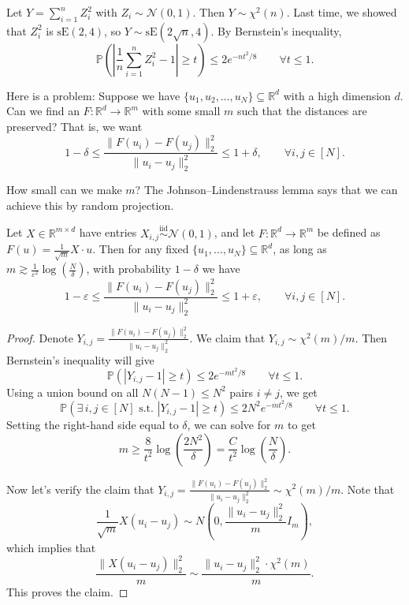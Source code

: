 \begin{exam}
    Let $Y = \sum_{i=1}^n Z_i^2$ with $Z_i \sim \mathcal{N}(0, 1)$. Then $Y \sim \chi^2(n)$. Last time, we showed that $Z_i^2$ is $\mathrm{sE}(2, 4)$, so $Y \sim \mathrm{sE}(2\sqrt{n}, 4)$. By Bernstein's inequality,
\[
\mathbb{P}\!\left( \left| \frac{1}{n} \sum_{i=1}^n Z_i^2 - 1 \right| \geq t \right) \leq 2 e^{-n t^2 / 8} \qquad \forall t \leq 1.
\]

Here is a problem: Suppose we have $\{u_1, u_2, \ldots, u_N\} \subseteq \mathbb{R}^d$ with a high dimension $d$. Can we find an $F : \mathbb{R}^d \to \mathbb{R}^m$ with some small $m$ such that the distances are preserved? That is, we want
\[
1 - \delta \leq \frac{\|F(u_i) - F(u_j)\|_2^2}{\|u_i - u_j\|_2^2} \leq 1 + \delta, \qquad \forall i, j \in [N].
\]

How small can we make $m$? The Johnson--Lindenstrauss lemma says that we can achieve this by random projection.

\begin{lem}
Let $X \in \mathbb{R}^{m \times d}$ have entries $X_{i,j} \overset{\mathrm{iid}}{\sim} \mathcal{N}(0, 1)$, and let $F : \mathbb{R}^d \to \mathbb{R}^m$ be defined as $F(u) = \tfrac{1}{\sqrt{m}} X \cdot u$. Then for any fixed $\{u_1, \ldots, u_N\} \subseteq \mathbb{R}^d$, as long as $m \gtrsim \tfrac{1}{\varepsilon^2} \log\!\left(\tfrac{N}{\delta}\right)$, with probability $1 - \delta$ we have
\[
1 - \varepsilon \leq \frac{\|F(u_i) - F(u_j)\|_2^2}{\|u_i - u_j\|_2^2} \leq 1 + \varepsilon, \qquad \forall i, j \in [N].
\]
\end{lem}
\begin{proof}
Denote $Y_{i,j} = \frac{\|F(u_i) - F(u_j)\|_2^2}{\|u_i - u_j\|_2^2}$. We claim that $Y_{i,j} \sim \chi^2(m)/m$. Then Bernstein's inequality will give
\[
\mathbb{P}(|Y_{i,j} - 1| \geq t) \leq 2 e^{-m t^2 / 8} \qquad \forall t \leq 1.
\]
Using a union bound on all $N(N-1) \leq N^2$ pairs $i \neq j$, we get
\[
\mathbb{P}\!\left( \exists\, i, j \in [N] \text{ s.t.\ } |Y_{i,j} - 1| \geq t \right) \leq 2 N^2 e^{-m t^2 / 8} \qquad \forall t \leq 1.
\]
Setting the right-hand side equal to $\delta$, we can solve for $m$ to get
\[
m \geq \frac{8}{t^2} \log\!\left( \frac{2 N^2}{\delta} \right) = \frac{C}{t^2} \log\!\left( \frac{N}{\delta} \right).
\]

Now let's verify the claim that $Y_{i,j} = \frac{\|F(u_i) - F(u_j)\|_2^2}{\|u_i - u_j\|_2^2} \sim \chi^2(m)/m$. Note that
\[
\frac{1}{\sqrt{m}} X(u_i - u_j) \sim N\!\left( 0, \frac{\|u_i - u_j\|_2^2}{m} I_m \right),
\]
which implies that
\[
\frac{\|X(u_i - u_j)\|_2^2}{m} \sim \frac{\|u_i - u_j\|_2^2 \cdot \chi^2(m)}{m}.
\]
This proves the claim. \qedhere
\end{proof}
\end{exam}

